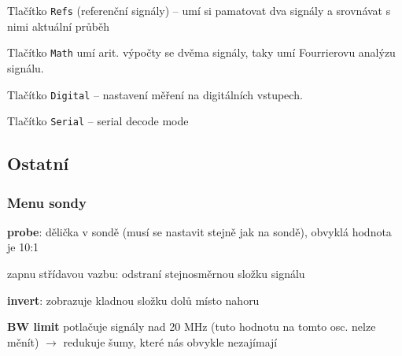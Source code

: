 Tlačítko \texttt{Refs}  (referenční signály) -- umí si pamatovat dva signály a srovnávat s nimi aktuální průběh  %

Tlačítko \texttt{Math}  umí arit. výpočty se dvěma signály, taky umí Fourrierovu analýzu signálu. 

Tlačítko  \texttt{Digital} -- nastavení měření na digitálních vstupech.

Tlačítko   \texttt{Serial} -- serial decode mode  



\subsection{Ostatní}

\subsubsection{Menu sondy} %

\textbf{probe}: dělička v sondě (musí se nastavit stejně jak na sondě), obvyklá hodnota je 10:1

zapnu střídavou vazbu: odstraní stejnosměrnou složku signálu %

\textbf{invert}: zobrazuje kladnou složku dolů místo nahoru 

\textbf{BW limit} potlačuje signály nad 20 MHz (tuto hodnotu na tomto osc. nelze měnít) $\rightarrow$ redukuje šumy, které nás obvykle nezajímají 




%	
%	
%	
%	
%	
%	











